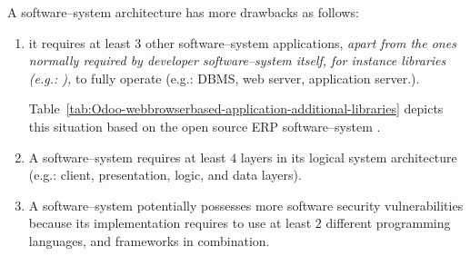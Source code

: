 A \webbrowserbased software--system
architecture has more drawbacks as
follows:

\begin{enumerate}[1.]
	\item it requires at least $3$ other 
		software--system applications, \emph{apart from
		the ones normally required by developer
		software--system itself, for instance libraries (e.g.:
		\logFourJ),} to fully operate
		(e.g.: DBMS, web server, application server.).
		
		Table~\ref{tab:Odoo-webbrowserbased-application-additional-libraries}
		depicts this situation based on the open source ERP
		software--system \Odoo.		
				
	\item A \webbrowserbased software--system
		requires at least $4$ layers in
		its logical system architecture
		(e.g.: client, presentation, logic,
		and data layers).

	\item A \webbrowserbased software--system
		potentially possesses more software
		security vulnerabilities because its
		implementation requires to use at least
		$2$ different programming languages, and
		frameworks in combination.
\end{enumerate}

